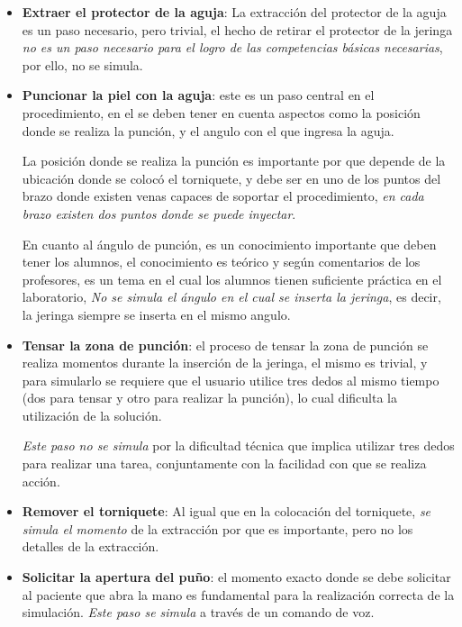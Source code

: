 \begin{itemize}
\item \textbf{Extraer el protector de la aguja}: La extracción del protector de
    la aguja es un paso necesario, pero trivial, el hecho de retirar el
    protector de la jeringa \emph{no es un paso necesario para el logro de las
        competencias básicas necesarias}, por ello, no se simula.

\item \textbf{Puncionar la piel con la aguja}: este es un paso central en el
    procedimiento, en el se deben tener en cuenta aspectos como la posición
    donde se realiza la punción, y el angulo con el que ingresa la aguja.

    La posición donde se realiza la punción es importante por que depende de la
    ubicación donde se colocó el torniquete, y debe ser en uno de los puntos del
    brazo donde existen venas capaces de soportar el procedimiento, \emph{en
        cada brazo existen dos puntos donde se puede inyectar}.

    En cuanto al ángulo de punción, es un conocimiento importante que deben
    tener los alumnos, el conocimiento es teórico y según comentarios de los
    profesores, es un tema en el cual los alumnos tienen suficiente práctica en
    el laboratorio, \emph{No se simula el ángulo en el cual se inserta la
        jeringa}, es decir, la jeringa siempre se inserta en el mismo angulo.

\item \textbf{Tensar la zona de punción}: el proceso de tensar la zona de
    punción se realiza momentos durante la inserción de la jeringa, el mismo es
    trivial, y para simularlo se requiere que el usuario utilice tres dedos al
    mismo tiempo (dos para tensar y otro para realizar la punción), lo cual
    dificulta la utilización de la solución.

    \emph{Este paso no se simula} por la dificultad técnica que implica utilizar
    tres dedos para realizar una tarea, conjuntamente con la facilidad con que
    se realiza acción. 

\item \textbf{Remover el torniquete}: Al igual que en la colocación del
    torniquete, \emph{se simula el momento} de la extracción por que es
    importante, pero no los detalles de la extracción.

\item \textbf{Solicitar la apertura del puño}: el momento exacto donde se debe
    solicitar al paciente que abra la mano es fundamental para la realización
    correcta de la simulación. \emph{Este paso se simula} a través de un comando
    de voz.


\end{itemize}
